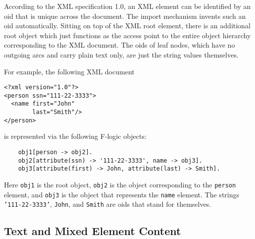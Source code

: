 According to the XML specification 1.0, an XML element can be identified
by an oid that is unique across the document. The import mechanism invents
such an oid automatically.
Sitting on top of the XML root element, there is an additional root
object which just functions as the access point to the entire object
hierarchy corresponding to the XML document.
The oids of leaf nodes, which have no outgoing arcs and carry
plain text only, are just the string values themselves.

For example, the following XML document

\begin{verbatim}
<?xml version="1.0"?>
<person ssn="111-22-3333">
  <name first="John" 
        last="Smith"/>
</person>
\end{verbatim}
is represented via the following F-logic objects:
\begin{verbatim}
    obj1[person -> obj2].
    obj2[attribute(ssn) -> '111-22-3333', name -> obj3].
    obj3[attribute(first) -> John, attribute(last) -> Smith].
\end{verbatim}
Here \texttt{obj1}  is the root object, \texttt{obj2} is the object
corresponding to the \texttt{person} element, and \texttt{obj3} is the
object that represents the \texttt{name} element. The strings
\texttt{'111-22-3333'}, \texttt{John}, and \texttt{Smith} are oids that
stand for themselves.       


\subsection{Text and Mixed Element Content}

